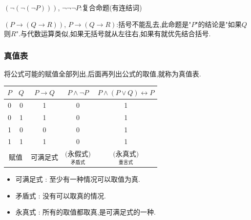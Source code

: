 \documentclass[UTF8,12pt]{ctexbook}
\begin{document}
{{{{{    $(\lnot(\lnot(\lnot P)))$, $\lnot\lnot\lnot P$:复合命题(有连结词)

    $(P \to (Q \to R))$, $P \to (Q \to R)$:括号不能乱去,此命题是"$P$"的结论是"如果$Q$则$R$".与代数运算类似,如果无括号就从左往右,如果有就优先结合括号.
  }%

  \subsubsection{真值表}{
    将公式可能的赋值全部列出,后面再列出公式的取值,就称为真值表.

    \begin{center}
      \begin{tabular}{c|c|c|c|c}
        \hline
        $P$                       & $Q$      & $P \to Q$                                   & $P \land\lnot P$                            & $P\land(P \lor Q) \longleftrightarrow P$ \\
        \hline
        0                         & 0        & 1                                           & 0                                           & 1                                        \\
        0                         & 1        & 1                                           & 0                                           & 1                                        \\
        1                         & 0        & 0                                           & 0                                           & 1                                        \\
        1                         & 1        & 1                                           & 0                                           & 1                                        \\
        \hline
        \multicolumn{2}{c|}{赋值} & 可满足式 & $\underset{\mbox{矛盾式}}{\mbox{(永假式)}}$ & $\underset{\mbox{重言式}}{\mbox{(永真式)}}$
      \end{tabular}
    \end{center}

    \begin{itemize}
      \item 可满足式 : 至少有一种情况可以取值为真.
      \item 矛盾式 : 没有可以取真的情况.
      \item 永真式 : 所有的取值都取真,是可满足式的一种.
    \end{itemize}
  }%

}}}}
\end{document}
